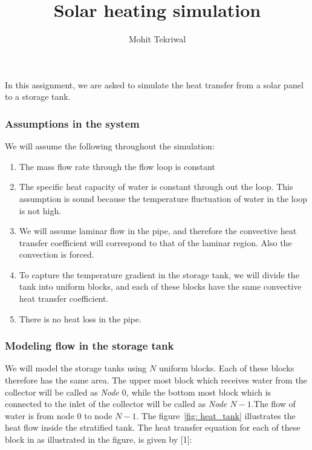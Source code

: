 \documentclass{article}
\title{Solar heating simulation}
\author{Mohit Tekriwal}
\date{}
\begin{document}
\maketitle

In this assignment, we are asked to simulate the heat transfer from a solar panel to a storage tank. 

\subsubsection*{Assumptions in the system}
We will assume the following throughout the simulation:

\begin{enumerate}
\item The mass flow rate through the flow loop is constant
\item The specific heat capacity of water is constant through out the loop. This assumption is sound because the temperature fluctuation of water in the loop is not high.
\item We will assume laminar flow in the pipe, and therefore the convective heat transfer coefficient will correspond to that of the laminar region. Also the convection is forced.
\item To capture the temperature gradient in the storage tank, we will divide the tank into uniform blocks, and each of these blocks have the same convective heat transfer coefficient.
\item There is no heat loss in the pipe.

\end{enumerate}

\subsubsection*{Modeling flow in the storage tank}
We will model the storage tanks using  $N$ uniform blocks. Each of these blocks therefore has the same area. The upper most block which receives water from the collector will be called as \emph{Node $0$}, while the bottom most block which is connected to the inlet of the collector will be called as \emph{Node $N-1$}.The flow of water is from node $0$ to node $N-1$.  The figure~\ref{fig: heat_tank} illustrates the heat flow inside the stratified tank. The heat transfer equation for each of these block in as illustrated in the figure, is given by [1]:
\end{document}
